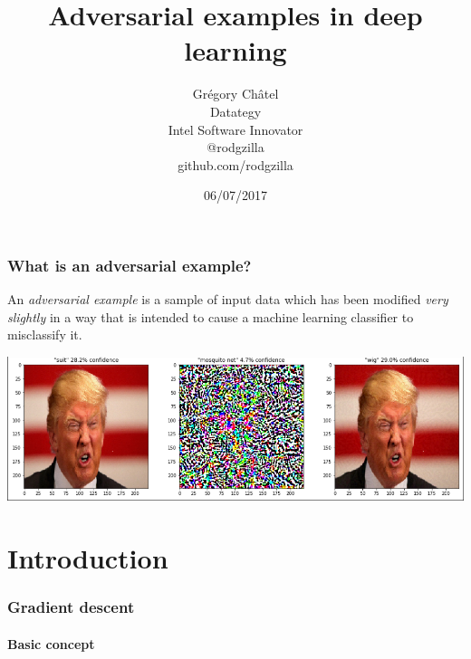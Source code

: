 \documentclass[9pt]{beamer}
\title{Adversarial examples in deep learning}
\author[G. Châtel]{Grégory Châtel\\\vspace{0.3cm}Datategy\\Intel Software Innovator\\\vspace{0.3cm}@rodgzilla\\github.com/rodgzilla}
\date{06/07/2017}
\begin{document}

\begin{frame}

  \maketitle

\end{frame}

\begin{frame}
  \frametitle{What is an adversarial example?}

  An \emph{adversarial example} is a sample of input data which has
  been modified \emph{very slightly} in a way that is intended to
  cause a machine learning classifier to misclassify it.

  \bigskip

  \pause

  \begin{center}
    \includegraphics[trim={2pt 2pt 2pt 0}, clip, width =
      \linewidth]{images/adversarial_example_wig.png}
  \end{center}

\end{frame}

\section{Introduction}

\begin{frame}
  \frametitle{Gradient descent}

  \framesubtitle{Basic concept}

  \begin{center}
    \scalebox{0.8}{
      
    }
  \end{center}

\end{frame}
\end{document}
